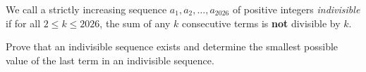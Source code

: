 We call a strictly increasing sequence $a_1,a_2,\dots, a_{2026}$ of positive integers
\emph{indivisible} if for all $2\leq k\leq 2026$,
the sum of any $k$ consecutive terms is \textbf{not} divisible by $k$.
    
Prove that an indivisible sequence exists and
determine the smallest possible value of the last term in an indivisible sequence.
